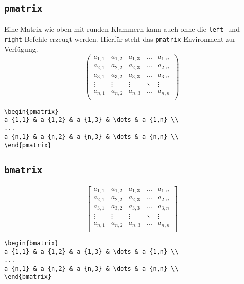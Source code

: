 \subsection{\texttt{pmatrix}}
Eine Matrix wie oben mit runden Klammern kann auch ohne die \texttt{left}- und \texttt{right}-Befehle erzeugt werden. Hierfür steht das \texttt{pmatrix}-Environment zur Verfügung.
\begin{equation*}
\begin{pmatrix}
a_{1,1} & a_{1,2} & a_{1,3} & \dots & a_{1,n} \\
a_{2,1} & a_{2,2} & a_{2,3} & \dots & a_{2,n} \\
a_{3,1} & a_{3,2} & a_{3,3} & \dots & a_{3,n} \\
\vdots & \vdots & \vdots & \ddots & \vdots \\
a_{n,1} & a_{n,2} & a_{n,3} & \dots & a_{n,n} \\
\end{pmatrix}
\end{equation*}
\begin{verbatim}
\begin{pmatrix}
a_{1,1} & a_{1,2} & a_{1,3} & \dots & a_{1,n} \\
...
a_{n,1} & a_{n,2} & a_{n,3} & \dots & a_{n,n} \\
\end{pmatrix}
\end{verbatim}

\subsection{\texttt{bmatrix}}

\begin{equation*}
\begin{bmatrix}
a_{1,1} & a_{1,2} & a_{1,3} & \dots & a_{1,n} \\
a_{2,1} & a_{2,2} & a_{2,3} & \dots & a_{2,n} \\
a_{3,1} & a_{3,2} & a_{3,3} & \dots & a_{3,n} \\
\vdots & \vdots & \vdots & \ddots & \vdots \\
a_{n,1} & a_{n,2} & a_{n,3} & \dots & a_{n,n} \\
\end{bmatrix}
\end{equation*}
\begin{verbatim}
\begin{bmatrix}
a_{1,1} & a_{1,2} & a_{1,3} & \dots & a_{1,n} \\
...
a_{n,1} & a_{n,2} & a_{n,3} & \dots & a_{n,n} \\
\end{bmatrix}
\end{verbatim}

